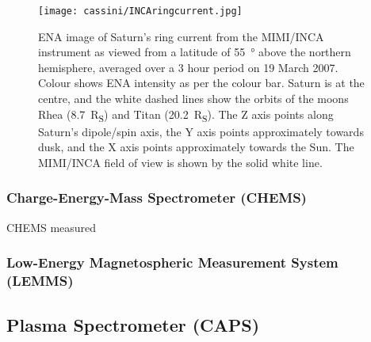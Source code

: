 \begin{figure}
\centering
\noindent\texttt{[image: cassini/INCAringcurrent.jpg]}
\caption[ENA image of Saturn's ring current from MIMI/INCA.]{ENA image of Saturn's ring current from the MIMI/INCA instrument as viewed from a latitude of \SI{55}{\degree} above  the northern hemisphere, averaged over a 3 hour period on 19 March 2007. Colour shows ENA intensity as per the colour bar. Saturn is at the  centre, and the white dashed lines show the orbits of the moons Rhea (\SI{8.7}{R_S}) and Titan (\SI{20.2}{R_S}). The Z axis points along Saturn's dipole/spin axis, the Y axis points approximately towards dusk, and the X axis points approximately  towards the Sun. The MIMI/INCA field of view is shown by the solid white line.}
\label{cassini:fig:INCAringcurrent}
\end{figure}

\subsubsection{Charge-Energy-Mass Spectrometer (CHEMS)}
CHEMS measured 
\subsubsection{Low-Energy Magnetospheric Measurement System (LEMMS)}

\subsection{Plasma Spectrometer (CAPS)}
